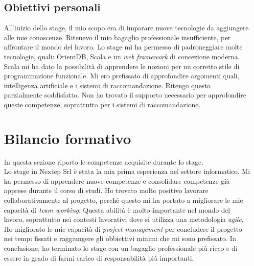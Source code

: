 \subsection{Obiettivi personali}
All'inizio dello stage, il mio scopo era di imparare nuove tecnologie da aggiungere alle mie conoscenze. Ritenevo il mio bagaglio professionale insufficiente, per affrontare il mondo del lavoro. Lo stage mi ha permesso di padroneggiare molte tecnologie, quali: OrientDB, Scala e un \emph{web \gls{framework}} di concezione moderna. Scala mi ha dato la possibilità di apprendere le nozioni per un corretto stile di programmazione funzionale. Mi ero prefissato di approfondire argomenti quali, intelligenza artificiale e i sistemi di raccomandazione. Ritengo questo parzialmente soddisfatto. Non ho trovato il supporto necessario per approfondire queste competenze, soprattutto per i sistemi di raccomandazione.




\section{Bilancio formativo}
In questa sezione riporto le competenze acquisite durante lo stage.\\
Lo stage in Nextep Srl è stata la  mia prima esperienza nel settore informatico. Mi ha permesso di apprendere nuove competenze e consolidare competenze già apprese durante il corso di studi.
Ho trovato molto positivo lavorare collaborativamente al progetto, perché questo mi ha portato a migliorare le mie capacità di \emph{team working}. Questa abilità è molto importante nel mondo del lavoro, soprattutto nei contesti lavorativi dove si utilizza una metodologia \emph{agile}. Ho migliorato le mie capacità di \emph{project management} per concludere il progetto nei tempi fissati e raggiungere gli obbiettivi minimi che mi sono prefissato. In conclusione, ho terminato lo stage con un bagaglio professionale più ricco e di essere in grado di farmi carico di responsabilità più importanti.
\newpage
